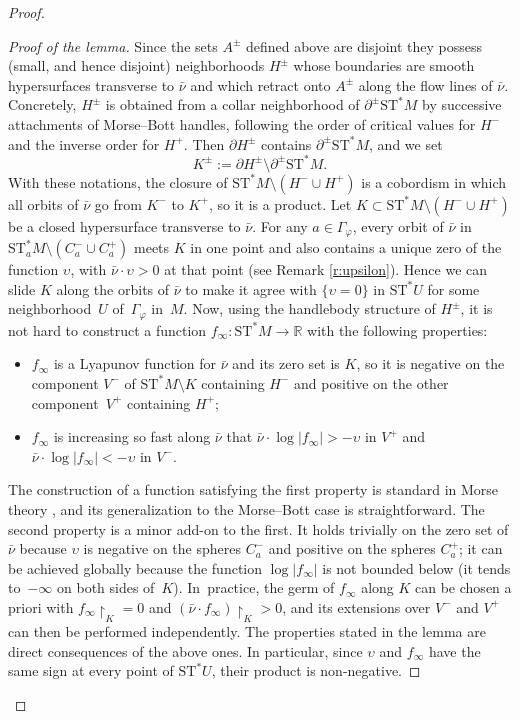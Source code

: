 \documentclass[10pt]{amsart}
\newcommand{\R}{{\mathbb R}}
\newcommand{\Crit}{\Gamma_{\!\varphi}}
\newcommand{\sST}{\mathrm{ST}^\ast}
\newcommand{\cnu}{\bar\nu}
\newcommand{\de}{\mathrel{:=}}
\newcommand{\rst}[1]{{\upharpoonright}_{\!#1}}
\let\del\partial
\let\on\colon
\let\ups\upsilon
\theoremstyle{plain}
\theoremstyle{definition}
\begin{document}
\begin{proof}
\begin{proof}[Proof of the lemma]
Since the sets $A^\pm$ defined above are disjoint they possess (small, and hence
disjoint) neighborhoods $H^\pm$ whose boundaries are smooth hypersurfaces
transverse to $\cnu$ and which retract onto $A^\pm$ along the flow lines of
$\cnu$. Concretely, $H^\pm$ is obtained from a collar neighborhood of $\del^\pm
\sST M$ by successive attachments of Morse--Bott handles, following the order
of critical values for $H^-$ and the inverse order for $H^+$. Then $\del H^\pm$
contains $\del^\pm \sST M$, and we set
\[
K^\pm \de \del H^\pm \setminus\del^\pm \sST M.
\]
With these notations, the closure of $\sST M \setminus (H^- \cup H^+)$ is a cobordism in
which all orbits of $\cnu$ go from $K^-$ to $K^+$, so it is a product. Let \hbox{$K
\subset \sST M \setminus (H^- \cup H^+)$} be a closed hypersurface transverse to $\cnu$.
For any $a \in \Crit$, every orbit of $\cnu$ in \hbox{$\sST_aM \setminus (C_a^- \cup C_a^+)$}
meets $K$ in one point and also contains a unique zero of the function $\ups$,
with $\cnu \cdot \ups > 0$ at that point (see Remark \ref{r:upsilon}). Hence we
can slide $K$ along the orbits of $\cnu$ to make it agree with $\{\ups=0\}$ in
$\sST U$ for some neighborhood~$U$ of~$\Crit$ in~$M$. Now, using the handlebody
structure of $H^\pm$, it is not hard to construct a function $f_\infty \on
\sST M \to \R$ with the following properties:
\begin{itemize}
\item
$f_\infty$ is a Lyapunov function for $\cnu$ and its zero set is $K$, so it is
negative on the component $V^-$ of $\sST M \setminus K$ containing $H^-$ and positive on
the other component~$V^+$ containing $H^+$;
\item
$f_\infty$ is increasing so fast along $\cnu$ that $\cnu \cdot \log|f_\infty| >
-\ups$ in $V^+$ and $\cnu \cdot \log|f_\infty| < -\ups$ in $V^-$.
\end{itemize}
The construction of a function satisfying the first property is standard in
Morse theory \cite{Sm}, and its generalization to the Morse--Bott case is
straightforward. The second property is a minor add-on to the first. It holds
trivially on the zero set of $\cnu$ because $\ups$ is negative on the spheres
$C_a^-$ and positive on the spheres $C_a^+$; it can be achieved globally because
the function $\log|f_\infty|$ is not bounded below (it tends to~$-\infty$ on
both sides of~$K$). In~practice, the germ of $f_\infty$ along $K$ can be chosen a priori with $f_\infty \rst K = 0$ and $(\cnu \cdot f_\infty) \rst K >
0$, and its extensions over $V^-$ and $V^+$ can then be performed independently.
The properties stated in the lemma are direct consequences of the above ones. In
particular, since $\ups$ and $f_\infty$ have the same sign at every point of
$\sST U$, their product is non-negative.
\end{proof}


\end{proof}
\end{document}
